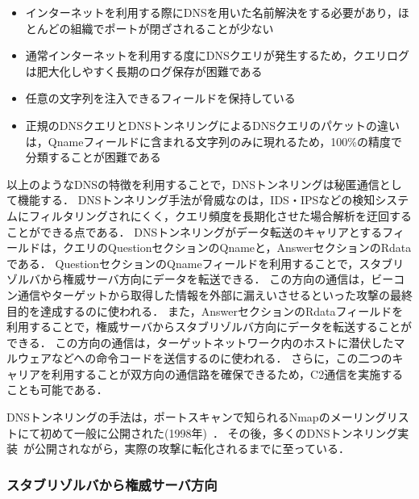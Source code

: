 \begin{itemize}
 \setlength{\itemsep}{0pt}
 \item インターネットを利用する際にDNSを用いた名前解決をする必要があり，ほとんどの組織でポートが閉ざされることが少ない
 \item 通常インターネットを利用する度にDNSクエリが発生するため，クエリログは肥大化しやすく長期のログ保存が困難である
 \item 任意の文字列を注入できるフィールドを保持している
 \item 正規のDNSクエリとDNSトンネリングによるDNSクエリのパケットの違いは，Qnameフィールドに含まれる文字列のみに現れるため，100\%の精度で分類することが困難である
\end{itemize}

以上のようなDNSの特徴を利用することで，DNSトンネリングは秘匿通信として機能する．
DNSトンネリング手法が脅威なのは，IDS・IPSなどの検知システムにフィルタリングされにくく，クエリ頻度を長期化させた場合解析を迂回することができる点である．
DNSトンネリングがデータ転送のキャリアとするフィールドは，クエリのQuestionセクションのQnameと，AnswerセクションのRdataである．
QuestionセクションのQnameフィールドを利用することで，スタブリゾルバから権威サーバ方向にデータを転送できる．
この方向の通信は，ビーコン通信やターゲットから取得した情報を外部に漏えいさせるといった攻撃の最終目的を達成するのに使われる．
また，AnswerセクションのRdataフィールドを利用することで，権威サーバからスタブリゾルバ方向にデータを転送することができる．
この方向の通信は，ターゲットネットワーク内のホストに潜伏したマルウェアなどへの命令コードを送信するのに使われる．
さらに，この二つのキャリアを利用することが双方向の通信路を確保できるため，C2通信を実施することも可能である．

DNSトンネリングの手法は，ポートスキャンで知られるNmapのメーリングリストにて初めて一般に公開された(1998年)~\cite{nmap}．
その後，多くのDNSトンネリング実装~\cite{ozymandns, iodine, dnscat2, tcp-over-dns, dnscat, denise, dns-shell, dnsbotnet, dnscapy, dohtunnel, godoh, dohc2, magictunnelandroid}が公開されながら，実際の攻撃に転化されるまでに至っている．


\subsubsection{スタブリゾルバから権威サーバ方向}
\label{sec:dns-exfiltration}

